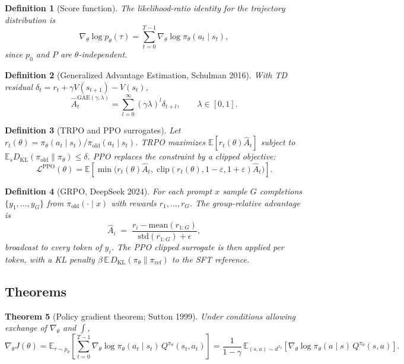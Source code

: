 \documentclass[11pt]{article}
\newtheorem{theorem}{Theorem}[section]
\newtheorem{definition}[theorem]{Definition}
\theoremstyle{remark}
\begin{document}
\begin{definition}[Score function]
The likelihood-ratio identity for the trajectory distribution is
\[
\nabla_\theta\log p_\theta(\tau)=\sum_{t=0}^{T-1}\nabla_\theta\log\pi_\theta(a_t\mid s_t),
\]
since $p_0$ and $P$ are $\theta$-independent.
\end{definition}

\begin{definition}[Generalized Advantage Estimation, Schulman 2016]
With TD residual $\delta_t=r_t+\gamma V(s_{t+1})-V(s_t)$,
\[
\hat A_t^{\mathrm{GAE}(\gamma,\lambda)}=\sum_{l=0}^{\infty}(\gamma\lambda)^l\delta_{t+l},\qquad \lambda\in[0,1].
\]
\end{definition}

\begin{definition}[TRPO and PPO surrogates]
Let $r_t(\theta)=\pi_\theta(a_t\mid s_t)/\pi_{\mathrm{old}}(a_t\mid s_t)$. TRPO maximizes $\mathbb{E}[r_t(\theta)\hat A_t]$ subject to $\mathbb{E}_s D_{\mathrm{KL}}(\pi_{\mathrm{old}}\|\pi_\theta)\leq\delta$. PPO replaces the constraint by a clipped objective:
\[
\mathcal{L}^{\mathrm{PPO}}(\theta)=\mathbb{E}\!\left[\min\!\bigl(r_t(\theta)\hat A_t,\;\mathrm{clip}(r_t(\theta),1-\varepsilon,1+\varepsilon)\hat A_t\bigr)\right].
\]
\end{definition}

\begin{definition}[GRPO, DeepSeek 2024]
For each prompt $x$ sample $G$ completions $\{y_1,\ldots,y_G\}$ from $\pi_{\mathrm{old}}(\cdot\mid x)$ with rewards $r_1,\ldots,r_G$. The group-relative advantage is
\[
\hat A_i \;=\; \frac{r_i-\mathrm{mean}(r_{1:G})}{\mathrm{std}(r_{1:G})+\epsilon},
\]
broadcast to every token of $y_i$. The PPO clipped surrogate is then applied per token, with a KL penalty $\beta\,\mathbb{E}\,D_{\mathrm{KL}}(\pi_\theta\|\pi_{\mathrm{ref}})$ to the SFT reference.
\end{definition}

\subsection*{Theorems}

\begin{theorem}[Policy gradient theorem; Sutton 1999]
\label{thm:pg}
Under conditions allowing exchange of $\nabla_\theta$ and $\int$,
\[
\nabla_\theta J(\theta)
=\mathbb{E}_{\tau\sim p_\theta}\!\left[\sum_{t=0}^{T-1}\nabla_\theta\log\pi_\theta(a_t\mid s_t)\,Q^{\pi_\theta}(s_t,a_t)\right]
=\frac{1}{1-\gamma}\,\mathbb{E}_{(s,a)\sim d^{\pi_\theta}}\!\left[\nabla_\theta\log\pi_\theta(a\mid s)\,Q^{\pi_\theta}(s,a)\right].
\]
\end{theorem}
\end{document}
